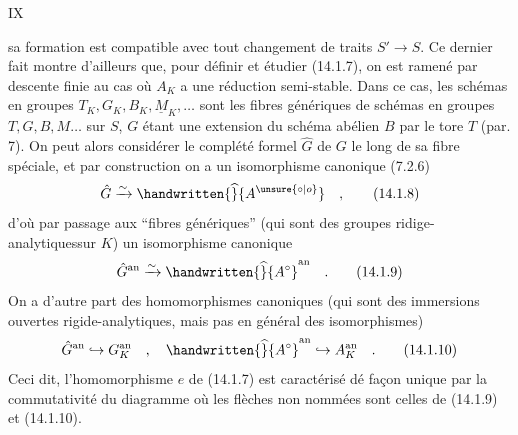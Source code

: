 \hfill IX

sa formation est compatible avec tout changement de traits $S'\longrightarrow S$. Ce dernier fait montre d'ailleurs que, pour définir et étudier (14.1.7), on est ramené par descente finie au cas où $A_K$ a une réduction semi-stable. Dans ce cas, les schémas en groupes $T_K,G_K,B_K,\underline M_K,\ldots$ sont les fibres génériques de schémas en groupes $T,G,B,M\ldots$ sur $S$, $G$ étant une extension du schéma abélien $B$ par le tore $T$ (par. 7). On peut alors considérer le complété formel $\hat G$ de $G$ le long de sa fibre spéciale, et par construction on a un isomorphisme canonique (7.2.6)
\[
 \hat G\xrightarrow{\sim}\handwritten{\widehat}{A^{\unsure{\circ|o}}}\quad, \tag*{(14.1.8)}
\]
d'où par passage aux ``fibres génériques'' (qui sont des groupes ridige-analytiquessur $K$) un isomorphisme canonique
\[
 \hat G^{\mathrm{an}}\xrightarrow{\sim}\handwritten{\widehat}{A^\circ}^{\mathrm{an}}\quad. \tag*{(14.1.9)}
\]
On a d'autre part des homomorphismes canoniques (qui sont des immersions ouvertes rigide-analytiques, mais pas en général des isomorphismes)
\[
 \hat G^{\mathrm{an}}\hookrightarrow G_K^{\mathrm{an}}\quad,\quad
 \handwritten{\widehat}{A^\circ}^{\mathrm{an}}\hookrightarrow A_K^{\mathrm{an}}\quad. \tag*{(14.1.10)}
\]
Ceci dit, l'homomorphisme $e$ de (14.1.7) est caractérisé dé façon unique par la commutativité du diagramme
où les flèches non nommées sont celles de (14.1.9) et (14.1.10).



